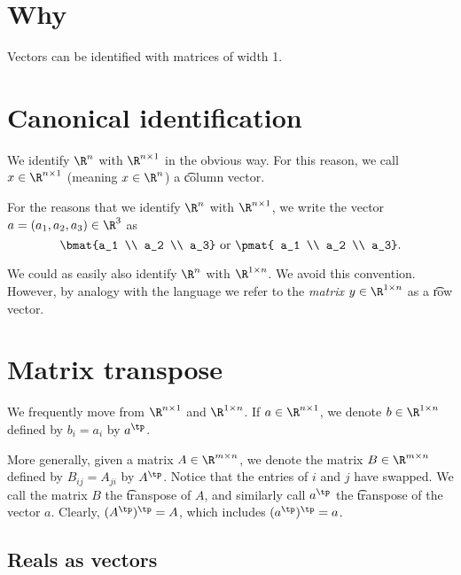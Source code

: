 
\section*{Why}

Vectors can be identified with matrices of width 1.

\section*{Canonical identification}

We identify $\R ^{n}$ with $\R ^{n \times  1}$ in the obvious way.
For this reason, we call $x \in \R ^{n \times  1}$ (meaning $x \in \R ^{n}$) a \t{column vector}.

For the reasons that we identify $\R ^n$ with $\R ^{n \times 1}$, we write the vector $a = (a_1, a_2, a_3) \in \R ^3$ as
  \[
\bmat{a_1 \\ a_2 \\ a_3}
\text{ or }
\pmat{ a_1 \\ a_2 \\ a_3}.
  \]

We could as easily also identify $\R ^{n}$ with $\R ^{1 \times n}$.
We avoid this convention.
However, by analogy with the language  we refer to the \textit{matrix} $y \in \R ^{1 \times  n}$ as a \t{row vector}.

\section*{Matrix transpose}

We frequently move from $\R ^{n \times  1}$ and $\R ^{1 \times n}$.
If $a \in \R ^{n \times  1}$, we denote $b \in \R ^{1 \times n}$ defined by $b_i = a_i$ by $a^\tp$.

More generally, given a matrix $A \in \R ^{m \times n}$, we denote the matrix $B \in \R ^{m \times  n}$ defined by $B_{ij} = A_{ji}$ by $A^\tp$.
Notice that the entries of $i$ and $j$ have swapped.
We call the matrix $B$ the \t{transpose} of $A$, and similarly call $a^\tp$ the \t{transpose} of the vector $a$.
Clearly, $(A^\tp)^\tp = A$, which includes $(a^\tp)^\tp = a$.

\subsection*{Reals as vectors}

